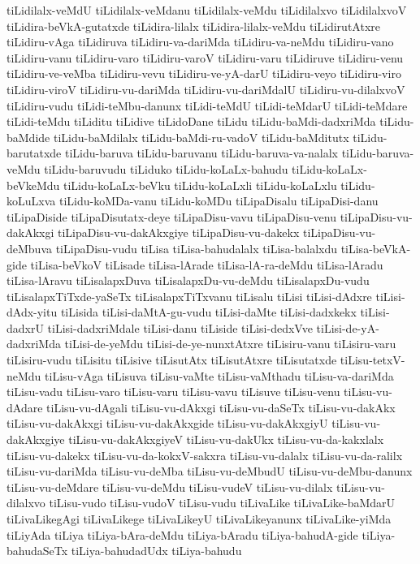 {tiLidilalx-veMdU
tiLidilalx-veMdanu
tiLidilalx-veMdu
tiLidilalxvo
tiLidilalxvoV
tiLidira-beVkA-gutatxde
tiLidira-lilalx
tiLidira-lilalx-veMdu
tiLidirutAtxre
tiLidiru-vAga
tiLidiruva
tiLidiru-va-dariMda
tiLidiru-va-neMdu
tiLidiru-vano
tiLidiru-vanu
tiLidiru-varo
tiLidiru-varoV
tiLidiru-varu
tiLidiruve
tiLidiru-venu
tiLidiru-ve-veMba
tiLidiru-vevu
tiLidiru-ve-yA-darU
tiLidiru-veyo
tiLidiru-viro
tiLidiru-viroV
tiLidiru-vu-dariMda
tiLidiru-vu-dariMdalU
tiLidiru-vu-dilalxvoV
tiLidiru-vudu
tiLidi-teMbu-danunx
tiLidi-teMdU
tiLidi-teMdarU
tiLidi-teMdare
tiLidi-teMdu
tiLiditu
tiLidive
tiLidoDane
tiLidu
tiLidu-baMdi-dadxriMda
tiLidu-baMdide
tiLidu-baMdilalx
tiLidu-baMdi-ru-vadoV
tiLidu-baMditutx
tiLidu-barutatxde
tiLidu-baruva
tiLidu-baruvanu
tiLidu-baruva-va-nalalx
tiLidu-baruva-veMdu
tiLidu-baruvudu
tiLiduko
tiLidu-koLaLx-bahudu
tiLidu-koLaLx-beVkeMdu
tiLidu-koLaLx-beVku
tiLidu-koLaLxli
tiLidu-koLaLxlu
tiLidu-koLuLxva
tiLidu-koMDa-vanu
tiLidu-koMDu
tiLipaDisalu
tiLipaDisi-danu
tiLipaDiside
tiLipaDisutatx-deye
tiLipaDisu-vavu
tiLipaDisu-venu
tiLipaDisu-vu-dakAkxgi
tiLipaDisu-vu-dakAkxgiye
tiLipaDisu-vu-dakekx
tiLipaDisu-vu-deMbuva
tiLipaDisu-vudu
tiLisa
tiLisa-bahudalalx
tiLisa-balalxdu
tiLisa-beVkA-gide
tiLisa-beVkoV
tiLisade
tiLisa-lArade
tiLisa-lA-ra-deMdu
tiLisa-lAradu
tiLisa-lAravu
tiLisalapxDuva
tiLisalapxDu-vu-deMdu
tiLisalapxDu-vudu
tiLisalapxTiTxde-yaSeTx
tiLisalapxTiTxvanu
tiLisalu
tiLisi
tiLisi-dAdxre
tiLisi-dAdx-yitu
tiLisida
tiLisi-daMtA-gu-vudu
tiLisi-daMte
tiLisi-dadxkekx
tiLisi-dadxrU
tiLisi-dadxriMdale
tiLisi-danu
tiLiside
tiLisi-dedxVve
tiLisi-de-yA-dadxriMda
tiLisi-de-yeMdu
tiLisi-de-ye-nunxtAtxre
tiLisiru-vanu
tiLisiru-varu
tiLisiru-vudu
tiLisitu
tiLisive
tiLisutAtx
tiLisutAtxre
tiLisutatxde
tiLisu-tetxV-neMdu
tiLisu-vAga
tiLisuva
tiLisu-vaMte
tiLisu-vaMthadu
tiLisu-va-dariMda
tiLisu-vadu
tiLisu-varo
tiLisu-varu
tiLisu-vavu
tiLisuve
tiLisu-venu
tiLisu-vu-dAdare
tiLisu-vu-dAgali
tiLisu-vu-dAkxgi
tiLisu-vu-daSeTx
tiLisu-vu-dakAkx
tiLisu-vu-dakAkxgi
tiLisu-vu-dakAkxgide
tiLisu-vu-dakAkxgiyU
tiLisu-vu-dakAkxgiye
tiLisu-vu-dakAkxgiyeV
tiLisu-vu-dakUkx
tiLisu-vu-da-kakxlalx
tiLisu-vu-dakekx
tiLisu-vu-da-kokxV-sakxra
tiLisu-vu-dalalx
tiLisu-vu-da-ralilx
tiLisu-vu-dariMda
tiLisu-vu-deMba
tiLisu-vu-deMbudU
tiLisu-vu-deMbu-danunx
tiLisu-vu-deMdare
tiLisu-vu-deMdu
tiLisu-vudeV
tiLisu-vu-dilalx
tiLisu-vu-dilalxvo
tiLisu-vudo
tiLisu-vudoV
tiLisu-vudu
tiLivaLike
tiLivaLike-baMdarU
tiLivaLikegAgi
tiLivaLikege
tiLivaLikeyU
tiLivaLikeyanunx
tiLivaLike-yiMda
tiLiyAda
tiLiya
tiLiya-bAra-deMdu
tiLiya-bAradu
tiLiya-bahudA-gide
tiLiya-bahudaSeTx
tiLiya-bahudadUdx
tiLiya-bahudu
}
